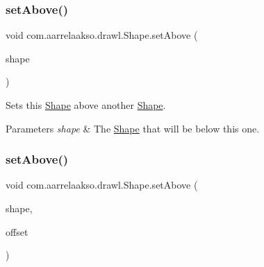 \subsubsection{\texorpdfstring{set\+Above()}{setAbove()}\hspace{0.1cm}{\footnotesize\ttfamily [1/2]}}
{\footnotesize\ttfamily void com.\+aarrelaakso.\+drawl.\+Shape.\+set\+Above (\begin{DoxyParamCaption}\item[{@Not\+Null final \hyperlink{classcom_1_1aarrelaakso_1_1drawl_1_1_shape}{Shape}}]{shape }\end{DoxyParamCaption})\hspace{0.3cm}{\ttfamily [inherited]}}



Sets this \hyperlink{classcom_1_1aarrelaakso_1_1drawl_1_1_shape}{Shape} above another \hyperlink{classcom_1_1aarrelaakso_1_1drawl_1_1_shape}{Shape}. 


\begin{DoxyParams}{Parameters}
{\em shape} & The \hyperlink{classcom_1_1aarrelaakso_1_1drawl_1_1_shape}{Shape} that will be below this one. \\
\hline
\end{DoxyParams}
\mbox{\label{classcom_1_1aarrelaakso_1_1drawl_1_1_shape_aad0b2fb173c0112b71b06cf90709acc3}} 
\subsubsection{\texorpdfstring{set\+Above()}{setAbove()}\hspace{0.1cm}{\footnotesize\ttfamily [2/2]}}
{\footnotesize\ttfamily void com.\+aarrelaakso.\+drawl.\+Shape.\+set\+Above (\begin{DoxyParamCaption}\item[{@Not\+Null final \hyperlink{classcom_1_1aarrelaakso_1_1drawl_1_1_shape}{Shape}}]{shape,  }\item[{@Not\+Null final \hyperlink{classcom_1_1aarrelaakso_1_1drawl_1_1_measure}{Measure}}]{offset }\end{DoxyParamCaption})\hspace{0.3cm}{\ttfamily [inherited]}}




